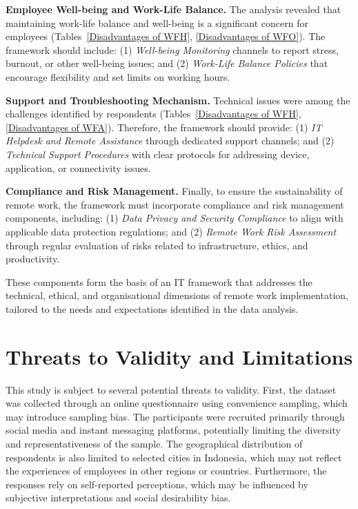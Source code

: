 \documentclass[a4paper, conference]{IEEEtran}
\begin{document}
\textbf{Employee Well-being and Work-Life Balance.}
The analysis revealed that maintaining work-life balance and well-being is a significant concern for employees (Tables~\ref{Disadvantages of WFH}, \ref{Disadvantages of WFO}). The framework should include: (1) \textit{Well-being Monitoring} channels to report stress, burnout, or other well-being issues; and (2) \textit{Work-Life Balance Policies} that encourage flexibility and set limits on working hours.

\textbf{Support and Troubleshooting Mechanism.}
Technical issues were among the challenges identified by respondents (Tables~\ref{Disadvantages of WFH}, \ref{Disadvantages of WFA}). Therefore, the framework should provide: (1) \textit{IT Helpdesk and Remote Assistance} through dedicated support channels; and (2) \textit{Technical Support Procedures} with clear protocols for addressing device, application, or connectivity issues.

\textbf{Compliance and Risk Management.}
Finally, to ensure the sustainability of remote work, the framework must incorporate compliance and risk management components, including: (1) \textit{Data Privacy and Security Compliance} to align with applicable data protection regulations; and (2) \textit{Remote Work Risk Assessment} through regular evaluation of risks related to infrastructure, ethics, and productivity.

These components form the basis of an IT framework that addresses the technical, ethical, and organisational dimensions of remote work implementation, tailored to the needs and expectations identified in the data analysis.




\section{Threats to Validity and Limitations}

This study is subject to several potential threats to validity. First, the dataset was collected through an online questionnaire using convenience sampling, which may introduce sampling bias. The participants were recruited primarily through social media and instant messaging platforms, potentially limiting the diversity and representativeness of the sample. The geographical distribution of respondents is also limited to selected cities in Indonesia, which may not reflect the experiences of employees in other regions or countries. Furthermore, the responses rely on self-reported perceptions, which may be influenced by subjective interpretations and social desirability bias.
\end{document}
